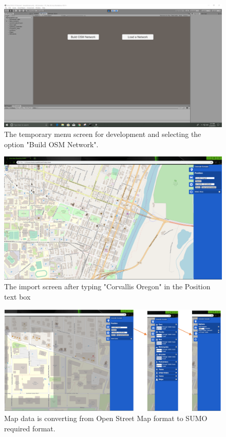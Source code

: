 \documentclass[letterpaper, 10pt, onecolumn, draftclsnofoot]{IEEEtran}
\begin{document}
\newpage
\begin{figure}[h!]
    \includegraphics[width=\textwidth]{TempMenuScreen_1}
    \caption{The temporary menu screen for development and selecting the option "Build OSM Network".}
    \label{fig:my_label}
\end{figure}
\begin{figure}[h!]
    \includegraphics[width=\textwidth]{OsmCorvallisSelection_3}
    \caption{The import screen after typing "Corvallis Oregon" in the Position text box}
    \label{fig:my_label}
\end{figure}

\newpage
\begin{figure}[h!]
    \includegraphics[width=\textwidth]{OSM_Settings}
    \caption{Map data is converting from Open Street Map format to SUMO required format.}
    \label{fig:my_label}
\end{figure}
\end{document}
